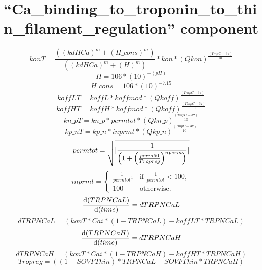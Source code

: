 \documentclass[10pt,landscape]{article}
\begin{document}
\section{``Ca\_binding\_to\_troponin\_to\_thin\_filament\_regulation'' component}
\textbf{}
\begin{displaymath}konT = \frac{\left(\left(kdHCa\right)^{m}+\left(H\_cons\right)^{m}\right)}{\left(\left(kdHCa\right)^{m}+\left(H\right)^{m}\right)} \ast kon \ast \left(Qkon\right)^{\frac{\left(TmpC-37\right)}{10}}
\end{displaymath}
\textbf{}
\begin{displaymath}H = 106 \ast \left(10\right)^{-(pH)}
\end{displaymath}
\textbf{}
\begin{displaymath}H\_cons = 106 \ast \left(10\right)^{-7.15}
\end{displaymath}
\textbf{}
\begin{displaymath}koffLT = koffL \ast koffmod \ast \left(Qkoff\right)^{\frac{\left(TmpC-37\right)}{10}}
\end{displaymath}
\textbf{}
\begin{displaymath}koffHT = koffH \ast koffmod \ast \left(Qkoff\right)^{\frac{\left(TmpC-37\right)}{10}}
\end{displaymath}
\textbf{}
\begin{displaymath}kn\_pT = kn\_p \ast permtot \ast \left(Qkn\_p\right)^{\frac{\left(TmpC-37\right)}{10}}
\end{displaymath}
\textbf{}
\begin{displaymath}kp\_nT = kp\_n \ast inprmt \ast \left(Qkp\_n\right)^{\frac{\left(TmpC-37\right)}{10}}
\end{displaymath}
\textbf{}
\begin{displaymath}permtot = \sqrt{\arrowvert\frac{1}{\left(1+\left(\frac{perm50}{Tropreg}\right)^{nperm}\right)}\arrowvert}
\end{displaymath}
\textbf{}
\begin{displaymath}inprmt = 
\begin{cases}\frac{1}{permtot};
        &  \text{if }\frac{1}{permtot} < 100,\\100&  \text{otherwise}.
\end{cases}
\end{displaymath}
\textbf{}
\begin{displaymath}\frac{\mathrm{d}(TRPNCaL)}{\mathrm{d}(time)} = dTRPNCaL
\end{displaymath}
\textbf{}
\begin{displaymath}dTRPNCaL = \left(konT \ast Cai \ast \left(1-TRPNCaL\right)-koffLT \ast TRPNCaL\right)
\end{displaymath}
\textbf{}
\begin{displaymath}\frac{\mathrm{d}(TRPNCaH)}{\mathrm{d}(time)} = dTRPNCaH
\end{displaymath}
\textbf{}
\begin{displaymath}dTRPNCaH = \left(konT \ast Cai \ast \left(1-TRPNCaH\right)-koffHT \ast TRPNCaH\right)
\end{displaymath}
\textbf{}
\begin{displaymath}Tropreg = \left(\left(1-SOVFThin\right) \ast TRPNCaL+SOVFThin \ast TRPNCaH\right)
\end{displaymath}
\end{document}
